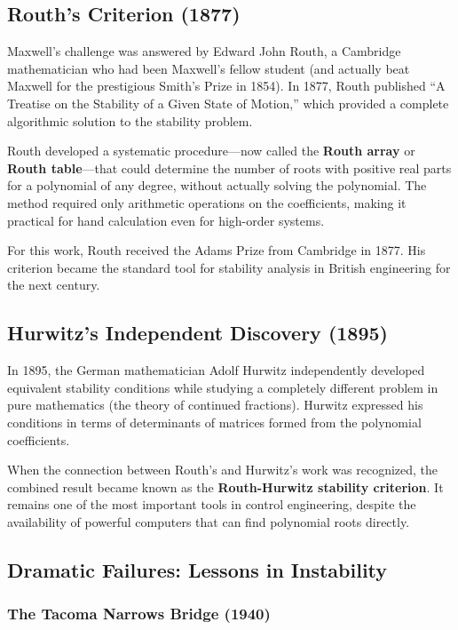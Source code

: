 \subsection{Routh's Criterion (1877)}

Maxwell's challenge was answered by Edward John Routh, a Cambridge mathematician who had been Maxwell's fellow student (and actually beat Maxwell for the prestigious Smith's Prize in 1854). In 1877, Routh published ``A Treatise on the Stability of a Given State of Motion,'' which provided a complete algorithmic solution to the stability problem.

Routh developed a systematic procedure---now called the \textbf{Routh array} or \textbf{Routh table}---that could determine the number of roots with positive real parts for a polynomial of any degree, without actually solving the polynomial. The method required only arithmetic operations on the coefficients, making it practical for hand calculation even for high-order systems.

For this work, Routh received the Adams Prize from Cambridge in 1877. His criterion became the standard tool for stability analysis in British engineering for the next century.

\subsection{Hurwitz's Independent Discovery (1895)}

In 1895, the German mathematician Adolf Hurwitz independently developed equivalent stability conditions while studying a completely different problem in pure mathematics (the theory of continued fractions). Hurwitz expressed his conditions in terms of determinants of matrices formed from the polynomial coefficients.

When the connection between Routh's and Hurwitz's work was recognized, the combined result became known as the \textbf{Routh-Hurwitz stability criterion}. It remains one of the most important tools in control engineering, despite the availability of powerful computers that can find polynomial roots directly.

\subsection{Dramatic Failures: Lessons in Instability}

\subsubsection{The Tacoma Narrows Bridge (1940)}

